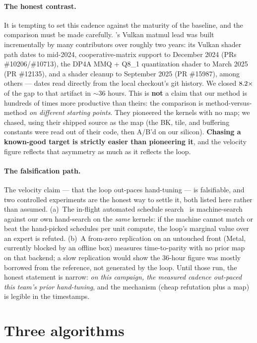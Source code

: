 \documentclass[11pt]{article}
\begin{document}
\paragraph{The honest contrast.} It is tempting to set this cadence against the maturity of the baseline,
and the comparison must be made carefully. 's Vulkan matmul lead was built incrementally by
many contributors over roughly two years: its Vulkan shader path dates to mid-2024, cooperative-matrix
support to December 2024 (PRs \#10206/\#10713), the DP4A MMQ + Q8\_1 quantization shader to March 2025
(PR \#12135), and a  shader cleanup to September 2025 (PR \#15987), among others --- dates read
directly from the local  checkout's git history. We closed $8.2\times$ of the gap to that
artifact in $\sim$36 hours. This is \textbf{not} a claim that our method is hundreds of times more
productive than theirs: the comparison is method-versus-method \emph{on different starting points}. They
pioneered the kernels with no map; we chased, using their shipped source as the map (the BK, tile, and
buffering constants were read out of their code, then A/B'd on our silicon). \textbf{Chasing a known-good
target is strictly easier than pioneering it}, and the velocity figure reflects that asymmetry as much as it
reflects the loop.

\paragraph{The falsification path.} The velocity claim --- that the loop out-paces hand-tuning --- is
falsifiable, and two controlled experiments are the honest way to settle it, both listed here rather than
assumed. (a)~The in-flight automated schedule search~\cite{tune} is machine-search against our own
hand-search on the \emph{same} kernels: if the machine cannot match or beat the hand-picked schedules per
unit compute, the loop's marginal value over an expert is refuted. (b)~A from-zero replication on an
untouched front (Metal, currently blocked by an offline box) measures time-to-parity with no prior map on
that backend; a slow replication would show the $36$-hour figure was mostly borrowed from the reference,
not generated by the loop. Until those run, the honest statement is narrow: \emph{on this campaign, the
measured cadence out-paced this team's prior hand-tuning}, and the mechanism (cheap refutation plus a map)
is legible in the timestamps.

\section{Three algorithms}
\label{sec:algorithms}
\end{document}

